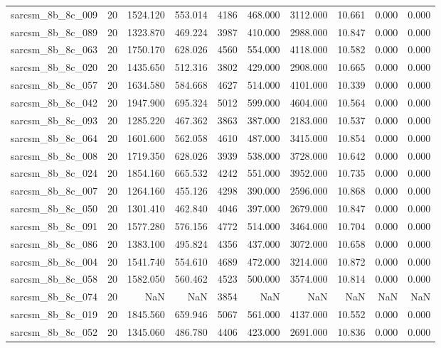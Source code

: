 \begin{tabular}{lrrrrrrrrr}
sarcsm\_8b\_8c\_009 & 20 & 1524.120 & 553.014 & 4186 & 468.000 & 3112.000 & 10.661 & 0.000 & 0.000 \\
sarcsm\_8b\_8c\_089 & 20 & 1323.870 & 469.224 & 3987 & 410.000 & 2988.000 & 10.847 & 0.000 & 0.000 \\
sarcsm\_8b\_8c\_063 & 20 & 1750.170 & 628.026 & 4560 & 554.000 & 4118.000 & 10.582 & 0.000 & 0.000 \\
sarcsm\_8b\_8c\_020 & 20 & 1435.650 & 512.316 & 3802 & 429.000 & 2908.000 & 10.665 & 0.000 & 0.000 \\
sarcsm\_8b\_8c\_057 & 20 & 1634.580 & 584.668 & 4627 & 514.000 & 4101.000 & 10.339 & 0.000 & 0.000 \\
sarcsm\_8b\_8c\_042 & 20 & 1947.900 & 695.324 & 5012 & 599.000 & 4604.000 & 10.564 & 0.000 & 0.000 \\
sarcsm\_8b\_8c\_093 & 20 & 1285.220 & 467.362 & 3863 & 387.000 & 2183.000 & 10.537 & 0.000 & 0.000 \\
sarcsm\_8b\_8c\_064 & 20 & 1601.600 & 562.058 & 4610 & 487.000 & 3415.000 & 10.854 & 0.000 & 0.000 \\
sarcsm\_8b\_8c\_008 & 20 & 1719.350 & 628.026 & 3939 & 538.000 & 3728.000 & 10.642 & 0.000 & 0.000 \\
sarcsm\_8b\_8c\_024 & 20 & 1854.160 & 665.532 & 4242 & 551.000 & 3952.000 & 10.735 & 0.000 & 0.000 \\
sarcsm\_8b\_8c\_007 & 20 & 1264.160 & 455.126 & 4298 & 390.000 & 2596.000 & 10.868 & 0.000 & 0.000 \\
sarcsm\_8b\_8c\_050 & 20 & 1301.410 & 462.840 & 4046 & 397.000 & 2679.000 & 10.847 & 0.000 & 0.000 \\
sarcsm\_8b\_8c\_091 & 20 & 1577.280 & 576.156 & 4772 & 514.000 & 3464.000 & 10.704 & 0.000 & 0.000 \\
sarcsm\_8b\_8c\_086 & 20 & 1383.100 & 495.824 & 4356 & 437.000 & 3072.000 & 10.658 & 0.000 & 0.000 \\
sarcsm\_8b\_8c\_004 & 20 & 1541.740 & 554.610 & 4689 & 472.000 & 3214.000 & 10.872 & 0.000 & 0.000 \\
sarcsm\_8b\_8c\_058 & 20 & 1582.050 & 560.462 & 4523 & 500.000 & 3574.000 & 10.814 & 0.000 & 0.000 \\
sarcsm\_8b\_8c\_074 & 20 & NaN & NaN & 3854 & NaN & NaN & NaN & NaN & NaN \\
sarcsm\_8b\_8c\_019 & 20 & 1845.560 & 659.946 & 5067 & 561.000 & 4137.000 & 10.552 & 0.000 & 0.000 \\
sarcsm\_8b\_8c\_052 & 20 & 1345.060 & 486.780 & 4406 & 423.000 & 2691.000 & 10.836 & 0.000 & 0.000 \\

\end{tabular}
